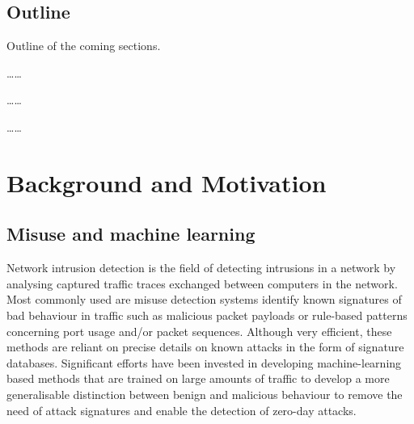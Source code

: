\documentclass[sigconf]{acmart}
\begin{document}
\subsection{Outline}


Outline of the coming sections.

\dots \dots

\dots \dots

\dots \dots




\section{Background and Motivation}

\subsection{Misuse and machine learning}


Network intrusion detection is the field of detecting intrusions in a network by analysing captured traffic traces exchanged between computers in the network. Most commonly used are misuse detection systems identify known signatures of bad behaviour in traffic such as malicious packet payloads or rule-based patterns concerning port usage and/or packet sequences. Although very efficient, these methods are reliant on precise details on known attacks in the form of signature databases. Significant efforts have been invested in developing machine-learning based methods that are trained on large amounts of traffic to develop a more generalisable distinction between benign and malicious behaviour to remove the need of attack signatures and enable the detection of zero-day attacks.
\end{document}
